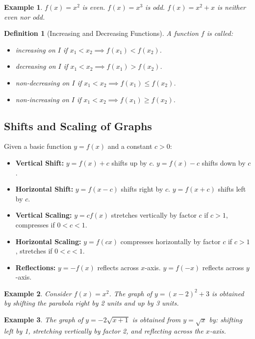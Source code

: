\documentclass[11pt,a4paper]{article}
\newtheorem{example}{Example}
\newtheorem{definition}{Definition}
\begin{document}
\begin{example}
$f(x) = x^2$ is even. $f(x) = x^3$ is odd. $f(x) = x^2 + x$ is neither even nor odd.
\end{example}
\begin{definition}[Increasing and Decreasing Functions]
A function $f$ is called:
\begin{itemize}
\item \textit{increasing} on $I$ if $x_1 < x_2 \implies f(x_1) < f(x_2)$.
\item \textit{decreasing} on $I$ if $x_1 < x_2 \implies f(x_1) > f(x_2)$.
\item \textit{non-decreasing} on $I$ if $x_1 < x_2 \implies f(x_1) \leq f(x_2)$.
\item \textit{non-increasing} on $I$ if $x_1 < x_2 \implies f(x_1) \geq f(x_2)$.
\end{itemize}
\end{definition}
\subsection{Shifts and Scaling of Graphs}
Given a basic function $y = f(x)$ and a constant $c > 0$:
\begin{itemize}
\item \textbf{Vertical Shift:} $y = f(x) + c$ shifts up by $c$. $y = f(x) - c$ shifts down by $c$.
\item \textbf{Horizontal Shift:} $y = f(x - c)$ shifts right by $c$. $y = f(x + c)$ shifts left by $c$.
\item \textbf{Vertical Scaling:} $y = cf(x)$ stretches vertically by factor $c$ if $c > 1$, compresses if $0 < c < 1$.
\item \textbf{Horizontal Scaling:} $y = f(cx)$ compresses horizontally by factor $c$ if $c > 1$, stretches if $0 < c < 1$.
\item \textbf{Reflections:} $y = -f(x)$ reflects across $x$-axis. $y = f(-x)$ reflects across $y$-axis.
\end{itemize}
\begin{example}
Consider $f(x) = x^2$. The graph of $y = (x-2)^2 + 3$ is obtained by shifting the parabola right by 2 units and up by 3 units.
\end{example}
\begin{example}
The graph of $y = -2\sqrt{x+1}$ is obtained from $y = \sqrt{x}$ by: shifting left by 1, stretching vertically by factor 2, and reflecting across the $x$-axis.
\end{example}
\end{document}
